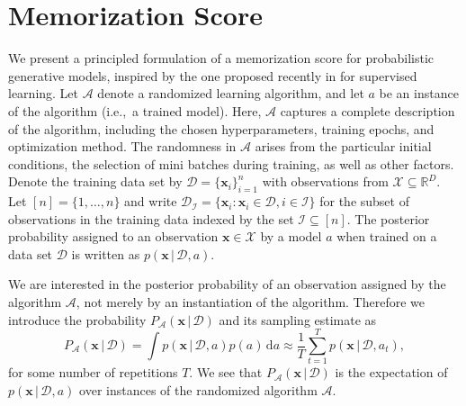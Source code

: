\documentclass{article}
\newcommand{\bft}[1]{\mathbf{#1}}
\newcommand{\myd}{\,\mathrm{d}}
\newcommand{\given}{\,|\,}
\begin{document}
\section{Memorization Score}%
\label{sec:memorization_score}

We present a principled formulation of a memorization score for probabilistic 
generative models, inspired by the one proposed recently in 
\cite{feldman2019does,feldman2020what} for supervised learning. Let 
$\mathcal{A}$ denote a randomized learning algorithm, and let $a$ be an 
instance of the algorithm (i.e.,~a trained model). Here, $\mathcal{A}$ 
captures a complete description of the algorithm, including the chosen 
hyperparameters, training epochs, and optimization method. The randomness in 
$\mathcal{A}$ arises from the particular initial conditions, the selection of 
mini batches during training, as well as other factors. Denote the training 
data set by $\mathcal{D} = \{\bft{x}_i\}_{i=1}^n$ with observations from 
$\mathcal{X} \subseteq \mathbb{R}^D$.  Let $[n] = \{1, \ldots, n\}$ and write 
$\mathcal{D}_{\mathcal{I}} = \{\bft{x}_i : \bft{x}_i \in \mathcal{D}, i \in 
\mathcal{I}\}$ for the subset of observations in the training data indexed by 
the set $\mathcal{I} \subseteq [n]$.  The posterior probability assigned to an 
observation $\bft{x} \in \mathcal{X}$ by a model $a$ when trained on a data 
set $\mathcal{D}$ is written as $p(\bft{x} \given \mathcal{D}, a)$.

We are interested in the posterior probability of an observation assigned by 
the algorithm $\mathcal{A}$, not merely by an instantiation of the algorithm.  
Therefore we introduce the probability
$P_{\mathcal{A}}(\bft{x} \given \mathcal{D})$ and its sampling estimate as
\begin{equation}
	\label{eq:logpAx}
	P_{\mathcal{A}}(\bft{x} \given \mathcal{D}) = \int p(\bft{x} \given 
	\mathcal{D}, a) p(a) \myd a \approx \frac{1}{T} \sum_{t = 1}^T 
	p(\bft{x} \given \mathcal{D}, a_t),
\end{equation}
for some number of repetitions $T$. We see that $P_{\mathcal{A}}(\bft{x} 
\given \mathcal{D})$ is the expectation of $p(\bft{x} \given \mathcal{D}, a)$ 
over instances of the randomized algorithm $\mathcal{A}$.
\end{document}
